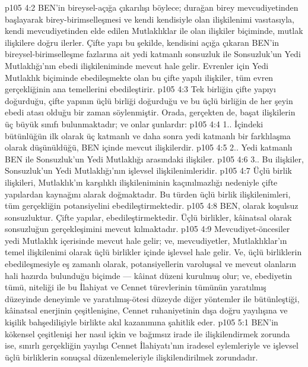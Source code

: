 \vs p105 4:2 BEN’in bireysel\hyp{}açığa çıkarılışı böylece; durağan birey mevcudiyetinden başlayarak birey\hyp{}birimselleşmesi ve kendi kendisiyle olan ilişkilenimi vasıtasıyla, kendi mevcudiyetinden elde edilen Mutlaklıklar ile olan ilişkiler biçiminde, mutlak ilişkilere doğru ilerler. Çifte yapı bu şekilde, kendisini açığa çıkaran BEN’in bireysel\hyp{}birimselleşme fazlarına ait yedi katmanlı sonsuzluk ile Sonsuzluk’un Yedi Mutlaklığı’nın ebedi ilişkileniminde mevcut hale gelir. Evrenler için Yedi Mutlaklık biçiminde ebedileşmekte olan bu çifte yapılı ilişkiler, tüm evren gerçekliğinin ana temellerini ebedileştirir.
\vs p105 4:3 Tek birliğin çifte yapıyı doğurduğu, çifte yapının üçlü birliği doğurduğu ve bu üçlü birliğin de her şeyin ebedi atası olduğu bir zaman söylenmiştir. Orada, gerçekten de, başat ilişkilerin üç büyük sınıfı bulunmaktadır; ve onlar şunlardır:
\vs p105 4:4 1.\bibnobreakspace {}. İçindeki bütünlüğün ilk olarak üç katmanlı ve daha sonra yedi katmanlı bir farklılaşma olarak düşünüldüğü, BEN içinde mevcut ilişkilerdir.
\vs p105 4:5 2.\bibnobreakspace {}. Yedi katmanlı BEN ile Sonsuzluk’un Yedi Mutlaklığı arasındaki ilişkiler.
\vs p105 4:6 3.\bibnobreakspace {}. Bu ilişkiler, Sonsuzluk’un Yedi Mutlaklığı’nın işlevsel ilişkilenimleridir.
\vs p105 4:7 Üçlü birlik ilişkileri, Mutlaklık’ın karşılıklı ilişkileniminin kaçınılmazlığı nedeniyle çifte yapılardan kaynağını alarak doğmaktadır. Bu türden üçlü birlik ilişkilenimleri, tüm gerçekliğin potansiyelini ebedileştirmektedir.
\vs p105 4:8 BEN,  olarak koşulsuz sonsuzluktur. Çifte yapılar,   ebedileştirmektedir. Üçlü birlikler, kâinatsal  olarak sonsuzluğun gerçekleşimini mevcut kılmaktadır.
\vs p105 4:9 Mevcudiyet\hyp{}öncesiler yedi Mutlaklık içerisinde mevcut hale gelir; ve, mevcudiyetler, Mutlaklıklar’ın temel ilişkilenimi olarak üçlü birlikler içinde işlevsel hale gelir. Ve, üçlü birliklerin ebedileşmesiyle eş zamanlı olarak, potansiyellerin varoluşsal ve mevcut olanların hali hazırda bulunduğu biçimde --- kâinat düzeni kurulmuş olur; ve, ebediyetin tümü, niteliği ile bu İlahiyat ve Cennet türevlerinin tümünün yaratılmış düzeyinde deneyimle ve yaratılmış\hyp{}ötesi düzeyde diğer yöntemler ile bütünleştiği, kâinatsal enerjinin çeşitlenişine, Cennet ruhaniyetinin dışa doğru yayılışına ve kişilik bahşedilişiyle birlikte akıl kazanımına şahitlik eder.
\vs p105 5:1 BEN’in kökensel çeşitlenişi her nasıl içkin ve bağımsız irade ile ilişkilendirmek zorunda ise, sınırlı gerçekliğin yayılışı Cennet İlahiyatı’nın iradesel eylemleriyle ve işlevsel üçlü birliklerin sonuçsal düzenlemeleriyle ilişkilendirilmek zorundadır.
